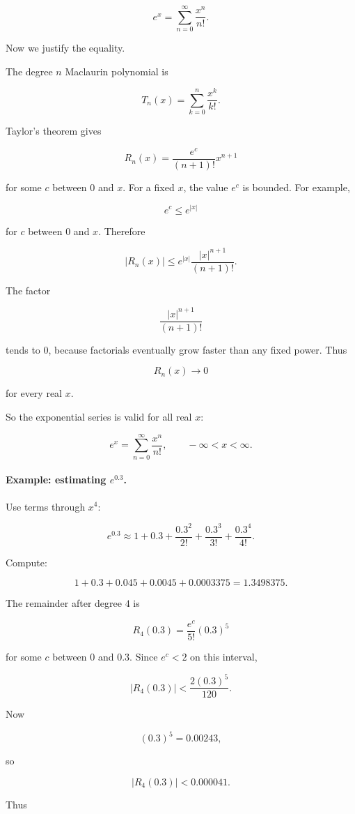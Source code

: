\[
\boxed{
e^x=\sum_{n=0}^{\infty}\frac{x^n}{n!}.
}
\]

Now we justify the equality.

The degree \(n\) Maclaurin polynomial is

\[
T_n(x)=\sum_{k=0}^{n}\frac{x^k}{k!}.
\]

Taylor's theorem gives

\[
R_n(x)=\frac{e^c}{(n+1)!}x^{n+1}
\]

for some \(c\) between \(0\) and \(x\).  For a fixed \(x\), the value \(e^c\) is bounded.
For example,

\[
e^c\le e^{|x|}
\]

for \(c\) between \(0\) and \(x\).  Therefore

\[
|R_n(x)|
\le
e^{|x|}\frac{|x|^{n+1}}{(n+1)!}.
\]

The factor

\[
\frac{|x|^{n+1}}{(n+1)!}
\]

tends to \(0\), because factorials eventually grow faster than any fixed power.  Thus

\[
R_n(x)\to0
\]

for every real \(x\).

So the exponential series is valid for all real \(x\):

\[
\boxed{
e^x=\sum_{n=0}^{\infty}\frac{x^n}{n!},
\qquad -\infty<x<\infty.
}
\]

\paragraph{Example: estimating \(e^{0.3}\).}
Use terms through \(x^4\):

\[
e^{0.3}
\approx
1+0.3+\frac{0.3^2}{2!}+\frac{0.3^3}{3!}+\frac{0.3^4}{4!}.
\]

Compute:

\[
1+0.3+0.045+0.0045+0.0003375
=
1.3498375.
\]

The remainder after degree \(4\) is

\[
R_4(0.3)=\frac{e^c}{5!}(0.3)^5
\]

for some \(c\) between \(0\) and \(0.3\).  Since \(e^c<2\) on this interval,

\[
|R_4(0.3)|<\frac{2(0.3)^5}{120}.
\]

Now

\[
(0.3)^5=0.00243,
\]

so

\[
|R_4(0.3)|<0.000041.
\]

Thus

